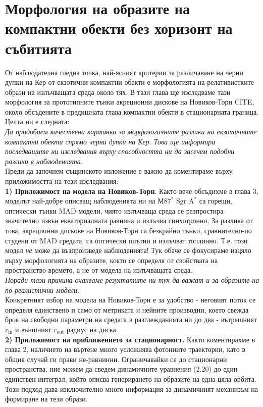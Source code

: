 \section{Морфология на образите на компактни обекти без хоризонт на събитията}
От наблюдателна гледна точка, най-ясният критерии за различаване на черни дупки на Кер от екзотични компактни обекти е морфологията на релативистките образи на излъчващата среда около тях. В тази глава ще изследваме тази морфология за прототипните тънки акреционни дискове на Новиков-Торн CITE, около обсъдените в предишната глава компактни обекти в стационарната граница. Целта ни е следната:\\

\emph{Да придобием качествена картинка за морфологичните разлики на екзотичните компактни обекти спрямо черни дупки на Кер. Това ще информира последващите ни изследвания върху способността ни да засечем подобни разлики в наблюденията.}\\

Преди да започнем същинското изложение е важно да коментираме върху приложимостта на тези изследвания:\\

\textbf{1) Приложимост на модела на Новиков-Торн}. Както вече обсъдихме в глава 3, моделът най-добре описващ наблюденията ни на М$87^*$ $\text{Sgr A}^*$ са горещи, оптически тънки MAD модели, чиято излъчваща среда се разпростира значително извън екваториалната равнина и излъчва синхотронно. За разлика от това, акреционни дискове на Новиков-Торн са безкрайно тънки, сравнително-по студени от MAD средата, са оптически плътни и излъчват топлинно. Т.е. този модел \emph{не} може да възпроизведе наблюденията! Тук обаче се фокусираме изцяло върху морфологията на образите, която се определя от свойствата на пространство-времето, а не от модела на излъчващата среда.\\

\emph{Поради тази причина очакваме резултатите ни тук да важат и за образите на по-реалистични модели.} \\

Конкретният избор на модела на Новиков-Торн е за удобство - неговият поток се определя единствено и само от метриката и нейните производни, което свежда броя на свободни параметри на средата в разглежданията ни до два - вътрешният $r_{\text{in}}$ и външният $r_\text{out}$ радиус на диска.\\

\textbf{2) Приложимост на приближението за стационарност.} Както коментирахме в глава 2, наличието на въртене много усложнява фотонните траектории, като в общия случай ги прави не-равнинни. Ограничавайки се до стационарни пространства, ние можем да сведем динамичните уравнения (2.20) до един единствен интеграл, който описва генерирането на образите на една цяла орбита. Този подход дава изключително много информация за динамичният механизъм на формиране на тези образи.\\

